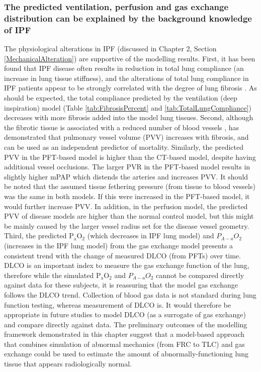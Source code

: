 \subsubsection{The predicted ventilation, perfusion and gas exchange distribution can be explained by the background knowledge of IPF}
The physiological alterations in IPF (discussed in Chapter 2, Section \ref{MechanicalAlteration}) are supportive of the modelling results. First, it has been found that IPF disease often results in reduction in total lung compliance (an increase in lung tissue stiffness), and the alterations of total lung compliance in IPF patients appear to be strongly correlated with the degree of lung fibrosis \citep{fulmer1979morphologic,plantier2018physiology}. As should be expected, the total compliance predicted by the ventilation (deep inspiration) model (Table \ref{tab:FibrosisPercent} and \ref{tab:TotalLungCompliance}) decreases with more fibrosis added into the model lung tissues. Second, although the fibrotic tissue is associated with a reduced number of blood vessels \citep{cosgrove2004pigment,ebina2004heterogeneous}, \cite{Jacob2016Mortality, Jacob2016Evaluation} has demonstrated that pulmonary vessel volume (PVV) increases with fibrosis, and can be used as an independent predictor of mortality. Similarly, the predicted PVV in the PFT-based model is higher than the CT-based model, despite having additional vessel occlusions. The larger PVR in the PFT-based model results in slightly higher mPAP which distends the arteries and increases PVV. It should be noted that the assumed tissue fethering pressure (from tissue to blood vessels) was the same in both models. If this were increased in the PFT-based model, it would further increase PVV. In addition, in the perfusion model, the predicted PVV of disease models are higher than the normal control model, but this might be mainly caused by the larger vessel radius set for the disease vessel geometry.  Third, the predicted $\mathrm{P_aO_2}$ (which decreases in IPF lung model) and $P_{A-a}O_2$ (increases in the IPF lung model) from the gas exchange model presents a consistent trend with the change of measured DLCO (from PFTs) over time. DLCO is an important index to measure the gas exchange function of the lung, therefore while the simulated $\mathrm{P_aO_2}$ and $P_{A-a}O_2$ cannot be compared directly against data for these subjects, it is reassuring that the model gas exchange follows the DLCO trend. Collection of blood gas data is not standard during lung function testing, whereas measurement of DLCO is. It would therefore be appropriate in future studies to model DLCO (as a surrogate of gas exchange) and compare directly against data. The preliminary outcomes of the modelling framework demonstrated in this chapter suggest that a model-based approach that combines simulation of abnormal mechanics (from FRC to TLC) and gas exchange could be used to  estimate the amount of abnormally-functioning lung tissue that appears radiologically normal. 

